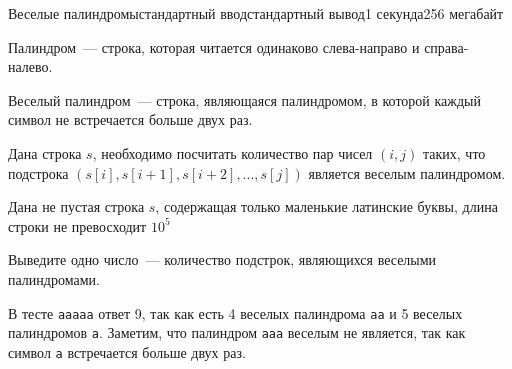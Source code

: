 \begin{problem}{Веселые палиндромы}{стандартный ввод}{стандартный вывод}{1 секунда}{256 мегабайт}

Палиндром~--- строка, которая читается одинаково слева-направо и справа-налево.

Веселый палиндром~--- строка, являющаяся палиндромом, в которой каждый символ не встречается больше двух раз.

Дана строка $s$, необходимо посчитать количество пар чисел $(i, j)$ таких, что подстрока $(s[i], s[i + 1], s[i + 2], ..., s[j])$ является веселым палиндромом.

\InputFile
Дана не пустая строка $s$, содержащая только маленькие латинские буквы, длина строки не превосходит $10^5$ 

\OutputFile
Выведите одно число~--- количество подстрок, являющихся веселыми палиндромами.

\Examples

\begin{example}
%
%
\end{example}

\Note
В тесте \texttt{aaaaa} ответ 9, так как есть 4 веселых палиндрома \texttt{aa} и 5 веселых палиндромов \texttt{a}. Заметим, что палиндром \texttt{aaa} веселым не является, так как символ \texttt{a} встречается больше двух раз.

\end{problem}

